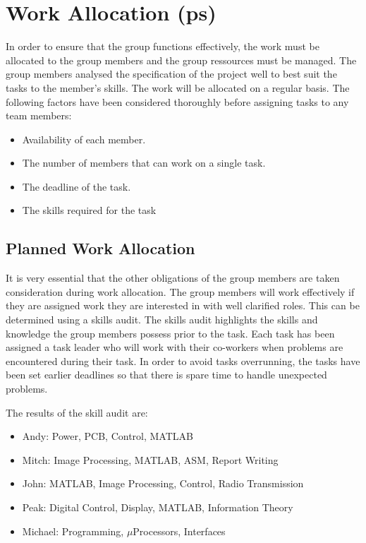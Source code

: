 \section{Work Allocation (ps)}

In order to ensure that the group functions effectively, the work must be allocated to the group members and the group ressources must be managed. The group members analysed the specification of the project well to best suit the tasks to the member's skills. The work will be allocated on a regular basis. The following factors have been considered thoroughly before assigning tasks to any team members:

\begin{itemize}
\item	Availability of each member. 

\item	The number of members that can work on a single task.

\item  The deadline of the task.

\item	The skills required for the task
\end{itemize}


\subsection*{Planned Work Allocation}
\label{sec:work_plan}

It is very essential that the other obligations of the group members are taken consideration during work allocation. 
The group members will work effectively if they are assigned work they are interested in with well clarified roles. This can be determined using a skills audit.
The skills audit highlights the skills and knowledge the group members possess prior to the task. 
Each task has been assigned a task leader who will work with their co-workers when problems are encountered during their task.
In order to avoid tasks overrunning, the tasks have been set earlier deadlines so that there is spare time to handle unexpected problems. 

The results of the skill audit are:

\begin{itemize}
\item Andy: Power, PCB, Control, MATLAB
\item Mitch: Image Processing, MATLAB, ASM, Report Writing
\item John: MATLAB, Image Processing, Control, Radio Transmission
\item Peak: Digital Control, Display, MATLAB, Information Theory
\item Michael: Programming, $\mu$Processors, Interfaces
\end{itemize}

